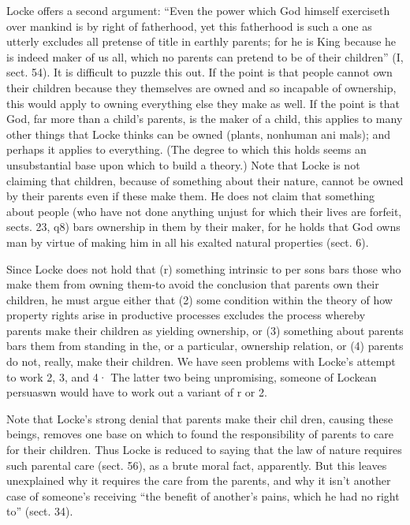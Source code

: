 \documentclass[11pt,openany]{book}
\begin{document}
Locke offers a second argument: ``Even the power which God himself exerciseth over mankind is by right of fatherhood, yet this fatherhood is such a one as utterly excludes all pretense of title in earthly parents; for he is King because he is indeed maker of us all, which no parents can pretend to be of their children'' (I, sect. 54). It is difficult to puzzle this out. If the point is that people cannot own their children because they themselves are owned and so incapable of ownership, this would apply to owning everything else they make as well. If the point is that God, far more than a child's parents, is the maker of a child, this applies to many other things that Locke thinks can be owned (plants, nonhuman ani mals); and perhaps it applies to everything. (The degree to which this holds seems an unsubstantial base upon which to build a theory.) Note that Locke is not claiming that children, because of something about their nature, cannot be owned by their parents even if these make them. He does not claim that something about people (who have not done anything unjust for which their lives are forfeit, sects. 23, q8) bars ownership in them by their maker, for he holds that God owns man by virtue of making him in all his exalted natural properties (sect. 6). 

Since Locke does not hold that (r) something intrinsic to per sons bars those who make them from owning them-to avoid the conclusion that parents own their children, he must argue either that (2) some condition within the theory of how property rights arise in productive processes excludes the process whereby parents make their children as yielding ownership, or (3) something about parents bars them from standing in the, or a particular, ownership relation, or (4) parents do not, really, make their children. We have seen problems with Locke's attempt to work 2, 3, and 4· The latter two being unpromising, someone of Lockean persuaswn would have to work out a variant of r or 2. 

Note that Locke's strong denial that parents make their chil dren, causing these beings, removes one base on which to found the responsibility of parents to care for their children. Thus Locke is reduced to saying that the law of nature requires such parental care (sect. 56), as a brute moral fact, apparently. But this leaves unexplained why it requires the care from the parents, and why it isn't another case of someone's receiving ``the benefit of another's pains, which he had no right to'' (sect. 34). 
\end{document}
